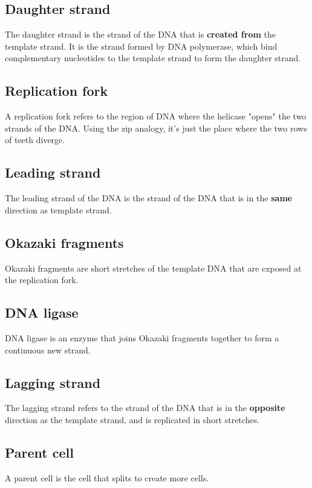\documentclass[11pt]{article}
\begin{document}
\subsection{Daughter strand}
\label{sec:orgc6f4b4d}
The daughter strand is the strand of the DNA that is \textbf{created from} the template strand. It is the strand formed by DNA polymerase, which bind complementary nucleotides to the template strand to form the daughter strand.

\subsection{Replication fork}
\label{sec:orgdf4b20e}
A replication fork refers to the region of DNA where the helicase "opens" the two strands of the DNA. Using the zip analogy, it's just the place where the two rows of teeth diverge.

\subsection{Leading strand}
\label{sec:orgfb0c326}
The leading strand of the DNA is the strand of the DNA that is in the \textbf{same} direction as template strand.

\subsection{Okazaki fragments}
\label{sec:org554e9de}
Okazaki fragments are short stretches of the template DNA that are exposed at the replication fork.

\subsection{DNA ligase}
\label{sec:org393a8e8}
DNA ligase is an enzyme that joins Okazaki fragments together to form a continuous new strand.

\subsection{Lagging strand}
\label{sec:org84d3e43}
The lagging strand refers to the strand of the DNA that is in the \textbf{opposite} direction as the template strand, and is replicated in short stretches.

\subsection{Parent cell}
\label{sec:orge34b635}
A parent cell is the cell that splits to create more cells.
\end{document}
